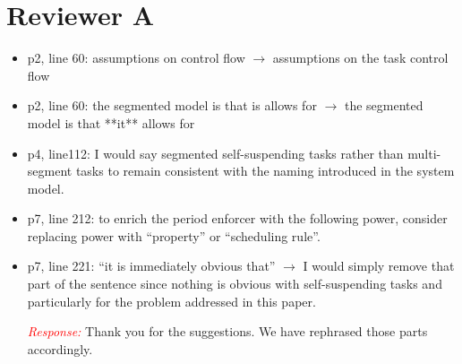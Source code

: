 \documentclass[12pt]{article}
\newenvironment{response}[0]{\textcolor{red}{\emph{Response: }}\color{blue}}{\medskip}
\begin{document}
\pagestyle{empty}

\section*{Reviewer A}

\begin{itemize}
	\item p2, line 60: assumptions on control flow $\rightarrow$ assumptions on
the task control flow
	\item p2, line 60: the segmented model is that is allows for $\rightarrow$ the
segmented model is that **it** allows for
	\item p4, line112: I would say segmented self-suspending tasks rather than
multi-segment tasks to remain consistent with the naming introduced in
the system model.
	\item p7, line 212:  to enrich the period enforcer with the following
power, consider replacing power with ``property'' or
``scheduling rule''.
	\item p7, line 221: ``it is immediately obvious that'' $\rightarrow$ I would simply
remove that part of the sentence since nothing is obvious with
self-suspending tasks and particularly for the problem addressed in this
paper.

\begin{response}
Thank you for the suggestions. We have rephrased those parts accordingly.
	
\end{response}

\end{itemize}
\end{document}
